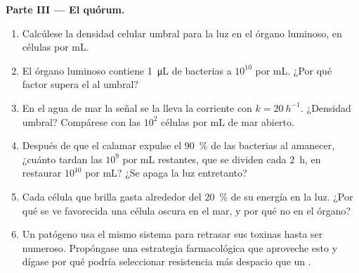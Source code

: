 \begin{problem}
\medskip
\noindent\textbf{Parte III --- El quórum.}
\begin{enumerate}[resume]
  \item Calcúlese la densidad celular umbral para la luz en el órgano
        luminoso, en células por mL.
  \item El órgano luminoso contiene \qty{1}{\micro L} de bacterias a
        $10^{10}$ por mL. ¿Por qué factor supera el  al
        umbral?
  \item En el agua de mar la señal se la lleva la corriente con
        $k = \qty{20}{h^{-1}}$. ¿Densidad umbral? Compárese con las
        $10^{2}$ células por mL de mar abierto.
  \item Después de que el calamar expulse el \qty{90}{\%} de las
        bacterias al amanecer, ¿cuánto tardan las $10^{9}$ por mL
        restantes, que se dividen cada \qty{2}{h}, en restaurar $10^{10}$
        por mL? ¿Se apaga la luz entretanto?
  \item Cada célula que brilla gasta alrededor del \qty{20}{\%} de su
        energía en la luz. ¿Por qué se ve favorecida una célula oscura en
        el mar, y por qué no en el órgano?
  \item Un patógeno usa el mismo sistema para retrasar sus toxinas hasta
        ser numeroso. Propóngase una estrategia farmacológica que
        aproveche esto y dígase por qué podría seleccionar resistencia
        más despacio que un .
\end{enumerate}


\end{problem}
